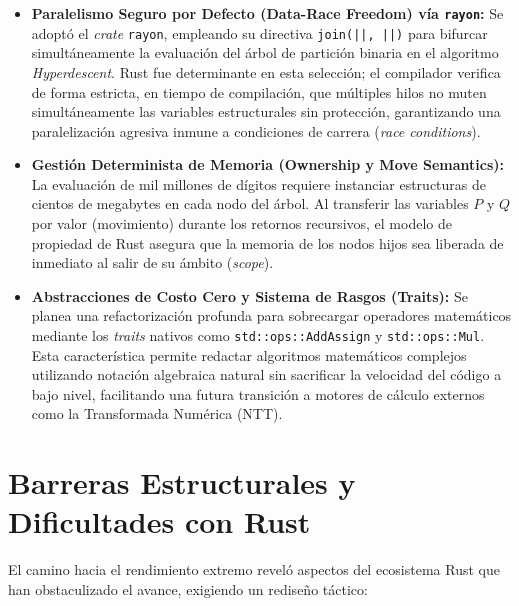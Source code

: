 \documentclass[12pt]{article}
\begin{document}
\begin{itemize}
    \item \textbf{Paralelismo Seguro por Defecto (Data-Race Freedom) vía \texttt{rayon}:} Se adoptó el \textit{crate} \texttt{rayon}, empleando su directiva \texttt{join(||, ||)} para bifurcar simultáneamente la evaluación del árbol de partición binaria en el algoritmo \textit{Hyperdescent}. Rust fue determinante en esta selección; el compilador verifica de forma estricta, en tiempo de compilación, que múltiples hilos no muten simultáneamente las variables estructurales sin protección, garantizando una paralelización agresiva inmune a condiciones de carrera (\textit{race conditions}).

    \item \textbf{Gestión Determinista de Memoria (Ownership y Move Semantics):} La evaluación de mil millones de dígitos requiere instanciar estructuras de cientos de megabytes en cada nodo del árbol. Al transferir las variables $P$ y $Q$ por valor (movimiento) durante los retornos recursivos, el modelo de propiedad de Rust asegura que la memoria de los nodos hijos sea liberada de inmediato al salir de su ámbito (\textit{scope}). 

    \item \textbf{Abstracciones de Costo Cero y Sistema de Rasgos (Traits):} Se planea una refactorización profunda para sobrecargar operadores matemáticos mediante los \textit{traits} nativos como \texttt{std::ops::AddAssign} y \texttt{std::ops::Mul}. Esta característica permite redactar algoritmos matemáticos complejos utilizando notación algebraica natural sin sacrificar la velocidad del código a bajo nivel, facilitando una futura transición a motores de cálculo externos como la Transformada Numérica (NTT).
\end{itemize}

\section{Barreras Estructurales y Dificultades con Rust}
El camino hacia el rendimiento extremo reveló aspectos del ecosistema Rust que han obstaculizado el avance, exigiendo un rediseño táctico:
\end{document}
